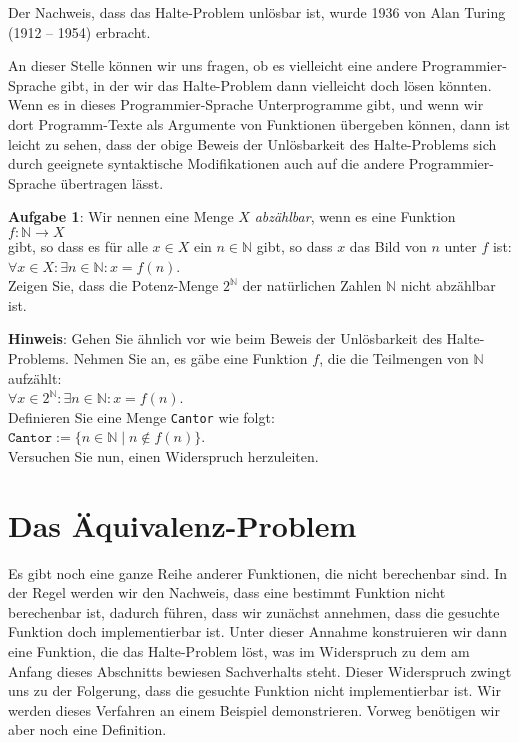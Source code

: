 \noindent
Der Nachweis, dass das Halte-Problem unl\"osbar ist, wurde 1936 von Alan Turing (1912 -- 1954)
\cite{turing:36} erbracht.
\vspace*{0.3cm}

An dieser Stelle k\"onnen wir uns fragen, ob es vielleicht eine andere Programmier-Sprache
gibt, in der wir das Halte-Problem dann vielleicht doch l\"osen k\"onnten.  
Wenn es in dieses Programmier-Sprache Unterprogramme gibt, und wenn wir dort
Programm-Texte als Argumente von Funktionen \"ubergeben k\"onnen, dann ist leicht zu sehen,
dass der obige Beweis der 
Unl\"osbarkeit des Halte-Problems sich durch geeignete syntaktische Modifikationen auch auf
die andere Programmier-Sprache \"ubertragen l\"asst.
\vspace*{0.3cm}

\noindent
\textbf{Aufgabe 1}:  
Wir nennen eine Menge $X$ \emph{abz\"ahlbar}, wenn  es eine Funktion \\[0.1cm]
\hspace*{1.3cm} $f: \mathbb{N} \rightarrow X$ \\[0.1cm]
gibt, so dass es f\"ur alle $x\in X$ ein $n \in \mathbb{N}$ gibt, so dass $x$ das Bild von
$n$ unter $f$ ist: \\[0.1cm]
\hspace*{1.3cm} $\forall x \in X: \exists n \in \mathbb{N}: x = f(n)$.
\\[0.1cm]
Zeigen Sie, dass die Potenz-Menge $2^\mathbb{N}$ der nat\"urlichen Zahlen $\mathbb{N}$ 
nicht abz\"ahlbar ist.  
\vspace*{0.1cm}

\noindent
\textbf{Hinweis}: Gehen Sie \"ahnlich vor wie beim Beweis der Unl\"osbarkeit des
Halte-Problems.  Nehmen Sie an, es g\"abe eine Funktion $f$, die die Teilmengen von
$\mathbb{N}$ aufz\"ahlt: \\[0.1cm]
\hspace*{1.3cm}  $\forall x \in 2^\mathbb{N}: \exists n \in \mathbb{N}: x = f(n)$.
\\[0.1cm]
Definieren Sie eine Menge \texttt{Cantor} wie folgt:
\\[0.1cm]
\hspace*{1.3cm} $\mathtt{Cantor} := \bigl\{ n \in \mathbb{N} \mid n \notin f(n) \bigr\}$.
\\[0.1cm]
Versuchen Sie nun, einen Widerspruch herzuleiten.


\section{Das \"Aquivalenz-Problem}
Es gibt noch eine ganze Reihe anderer Funktionen, die nicht berechenbar sind.  In der
Regel werden wir den Nachweis, dass eine bestimmt Funktion nicht berechenbar ist, dadurch f\"uhren, dass
wir zun\"achst annehmen, dass die gesuchte Funktion doch implementierbar ist.  Unter dieser Annahme
konstruieren wir dann eine Funktion, die das Halte-Problem l\"ost, was im Widerspruch zu dem am Anfang dieses Abschnitts
bewiesen Sachverhalts steht.
Dieser Widerspruch zwingt uns zu der Folgerung, dass die gesuchte Funktion nicht implementierbar ist.
Wir werden dieses Verfahren an einem Beispiel demonstrieren. Vorweg ben\"otigen wir aber
noch eine Definition.

